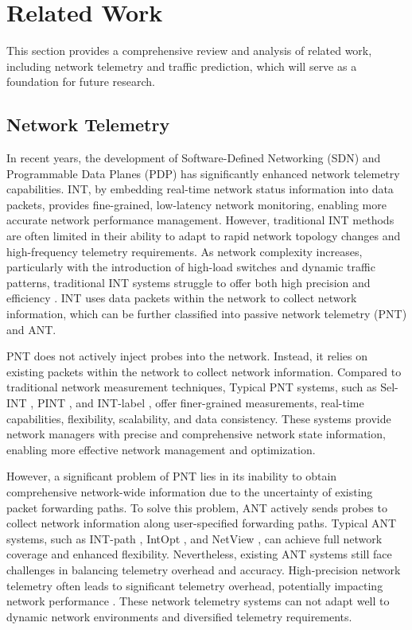 \section{Related Work}
\label{section2}
This section provides a comprehensive review and analysis of related work, including network telemetry and traffic prediction, which will serve as a foundation for future research.

\subsection{Network Telemetry}
In recent years, the development of Software-Defined Networking (SDN) and Programmable Data Planes (PDP) has significantly enhanced network telemetry capabilities. INT, by embedding real-time network status information into data packets, provides fine-grained, low-latency network monitoring, enabling more accurate network performance management. However, traditional INT methods are often limited in their ability to adapt to rapid network topology changes and high-frequency telemetry requirements. As network complexity increases, particularly with the introduction of high-load switches and dynamic traffic patterns, traditional INT systems struggle to offer both high precision and efficiency \cite{5}. INT uses data packets within the network to collect network information, which can be further classified into passive network telemetry (PNT) and ANT.

PNT does not actively inject probes into the network. Instead, it relies on existing packets within the network to collect network information. Compared to traditional network measurement techniques, 
Typical PNT systems, such as Sel-INT \cite{33}, PINT \cite{10}, and INT-label \cite{11}, offer finer-grained measurements, real-time capabilities, flexibility, scalability, and data consistency. These systems provide network managers with precise and comprehensive network state information, enabling more effective network management and optimization.

However, a significant problem of PNT lies in its inability to obtain comprehensive network-wide information due to the uncertainty of existing packet forwarding paths. To solve this problem, ANT actively sends probes to collect network information along user-specified forwarding paths. Typical ANT systems, such as INT-path \cite{12}, IntOpt \cite{8}, and NetView \cite{13}, can achieve full network coverage and enhanced flexibility. 
Nevertheless, existing ANT systems still face challenges in balancing telemetry overhead and accuracy. High-precision network telemetry often leads to significant telemetry overhead, potentially impacting network performance \cite{9}. 
These network telemetry systems can not adapt well to dynamic network environments and diversified telemetry requirements.

